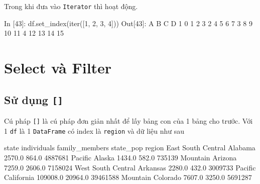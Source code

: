 \documentclass[
]{book}
\newenvironment{Shaded}{\begin{snugshade}}{\end{snugshade}}
\newcommand{\BuiltInTok}[1]{#1}
\newcommand{\DecValTok}[1]{\textcolor[rgb]{0.00,0.00,0.81}{#1}}
\newcommand{\FloatTok}[1]{\textcolor[rgb]{0.00,0.00,0.81}{#1}}
\newcommand{\NormalTok}[1]{#1}
\begin{document}
Trong khi đưa vào \texttt{Iterator} thì hoạt động.

\begin{Shaded}
\begin{Highlighting}[]
\NormalTok{In [}\DecValTok{43}\NormalTok{]: df.set\_index(}\BuiltInTok{iter}\NormalTok{([}\DecValTok{1}\NormalTok{, }\DecValTok{2}\NormalTok{, }\DecValTok{3}\NormalTok{, }\DecValTok{4}\NormalTok{]))}
\NormalTok{Out[}\DecValTok{43}\NormalTok{]:}
\NormalTok{    A   B   C   D}
\DecValTok{1}   \DecValTok{0}   \DecValTok{1}   \DecValTok{2}   \DecValTok{3}
\DecValTok{2}   \DecValTok{4}   \DecValTok{5}   \DecValTok{6}   \DecValTok{7}
\DecValTok{3}   \DecValTok{8}   \DecValTok{9}  \DecValTok{10}  \DecValTok{11}
\DecValTok{4}  \DecValTok{12}  \DecValTok{13}  \DecValTok{14}  \DecValTok{15}
\end{Highlighting}
\end{Shaded}

\hypertarget{select-vuxe0-filter}{%
\chapter{Select và Filter}\label{select-vuxe0-filter}}

\hypertarget{sux1eed-dux1ee5ng}{%
\section{\texorpdfstring{Sử dụng \texttt{{[}{]}}}{Sử dụng {[}{]}}}\label{sux1eed-dux1ee5ng}}

Cú pháp \texttt{{[}{]}} là cú pháp đơn giản nhất để lấy bảng con của 1 bảng cho trước.
Với 1 \texttt{df} là 1 \texttt{DataFrame} có index là \texttt{region} và dữ liệu như sau

\begin{Shaded}
\begin{Highlighting}[]
\NormalTok{                         state  individuals  family\_members  state\_pop}
\NormalTok{region                                                                }
\NormalTok{East South Central     Alabama       }\FloatTok{2570.0}           \FloatTok{864.0}    \DecValTok{4887681}
\NormalTok{Pacific                 Alaska       }\FloatTok{1434.0}           \FloatTok{582.0}     \DecValTok{735139}
\NormalTok{Mountain               Arizona       }\FloatTok{7259.0}          \FloatTok{2606.0}    \DecValTok{7158024}
\NormalTok{West South Central    Arkansas       }\FloatTok{2280.0}           \FloatTok{432.0}    \DecValTok{3009733}
\NormalTok{Pacific             California     }\FloatTok{109008.0}         \FloatTok{20964.0}   \DecValTok{39461588}
\NormalTok{Mountain              Colorado       }\FloatTok{7607.0}          \FloatTok{3250.0}    \DecValTok{5691287}
\end{Highlighting}
\end{Shaded}
\end{document}
